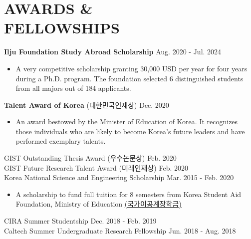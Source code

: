 \documentclass[margin, 10pt]{res} %
\begin{document}
\begin{resume}
\begin{enumerate}
\end{enumerate}





\section{AWARDS \& \\ FELLOWSHIPS}
\textbf{Ilju Foundation Study Abroad Scholarship} \hfill Aug. 2020 - Jul. 2024
\begin{itemize}
    \item[] A very competitive scholarship granting 30,000 USD per year for four years during a Ph.D. program. The foundation selected 6 distinguished students from all majors out of 184 applicants.
\end{itemize}
\textbf{Talent Award of Korea} (대한민국인재상) \hfill Dec. 2020
\begin{itemize}
    \item[] An award bestowed by the Minister of Education of Korea. It recognizes those individuals who are likely to become Korea's future leaders and have performed exemplary talents.
\end{itemize}
GIST Outstanding Thesis Award (우수논문상) \hfill Feb. 2020\\
GIST Future Research Talent Award (미래인재상) \hfill Feb. 2020\\
Korea National Science and Engineering Scholarship \hfill Mar. 2015 - Feb. 2020
\begin{itemize}
    \item[] A scholarship to fund full tuition for 8 semesters from Korea Student Aid Foundation, Ministry of Education \href{https://www.gov.kr/portal/service/serviceInfo/B55252900005}{(국가이공계장학금)}
\end{itemize}
CIRA Summer Studentship \hfill Dec. 2018 - Feb. 2019\\
Caltech Summer Undergraduate Research Fellowship \hfill Jun. 2018 - Aug. 2018\\



\end{resume}
\end{document}
